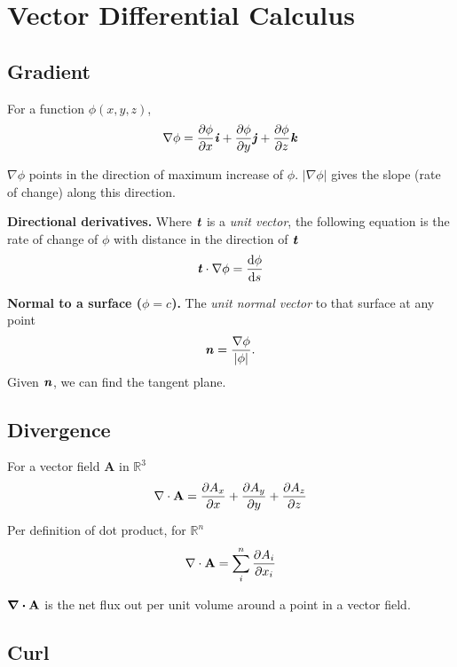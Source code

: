 \section{Vector Differential Calculus}

\subsection*{Gradient}
For a function $\phi(x, y, z)$,
\begin{equation*}
    \nabla \phi = \pdv{\phi}{x} \textbf{\textit{i}} + \pdv{\phi}{y} \textbf{\textit{j}} + \pdv{\phi}{z} \textbf{\textit{k}}
\end{equation*}

$\nabla \phi$ points in the direction of maximum increase of $\phi$. $|\nabla \phi|$ gives the slope (rate of change) along this direction.

\textbf{Directional derivatives.} Where $\textbf{\textit{t}}$ is a \textit{unit vector},
the following equation is the rate of change of $\phi$ with distance in the direction of $\textbf{\textit{t}}$
\begin{equation*}
    \textbf{\textit{t}} \cdot \nabla \phi = \dv{\phi}{s}
\end{equation*}

\textbf{Normal to a surface ($\phi = c$).} The \textit{unit normal vector} to that surface at any point
\begin{equation*}
    \textbf{\textit{n}} = \frac{\nabla \phi}{|\phi|}.
\end{equation*}
Given $\textbf{\textit{n}}$, we can find the tangent plane.
\subsection*{Divergence}
For a vector field $\mathbf{A}$ in $\mathbb{R}^3$
\begin{equation*}
    \nabla \cdot \mathbf{A} = \pdv{A_x}{x} + \smash{\pdv{A_y}{y}}+ \pdv{A_z}{z}
\end{equation*}

Per definition of dot product, for $\mathbb{R}^n$
\begin{equation*}
    \nabla \cdot \mathbf{A} = \sum_{i}^{n} \pdv{A_i}{x_i}
\end{equation*}

$\divergence \mathbf{A}$ is the net flux out per unit volume around a point in a vector field.

\subsection*{Curl}

